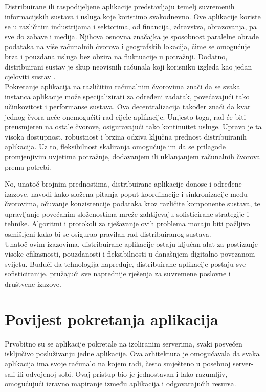 \documentclass[times, utf8, diplomski]{fer}
\begin{document}
Distribuirane ili raspodijeljene aplikacije predstavljaju temelj suvremenih informacijskih sustava i usluga koje koristimo svakodnevno. Ove aplikacije koriste se u različitim industrijama i sektorima, od financija, zdravstva, obrazovanja, pa sve do zabave i medija. Njihova osnovna značajka je sposobnost paralelne obrade podataka na više računalnih čvorova i geografskih lokacija, čime se omogućuje brza i pouzdana usluga bez obzira na fluktuacije u potražnji. Dodatno, distribuirani sustav je skup neovisnih računala koji korisniku izgleda kao jedan cjeloviti sustav \citep{tanenbaum_distributed_2007}.\\

Pokretanje aplikacija na različitim računalnim čvorovima znači da se svaka instanca aplikacije može specijalizirati za određeni zadatak, povećavajući tako učinkovitost i performanse sustava. Ova decentralizacija također znači da kvar jednog čvora neće onemogućiti rad cijele aplikacije. Umjesto toga, rad će biti preusmjeren na ostale čvorove, osiguravajući tako kontinuitet usluge. Upravo je ta visoka dostupnost, robustnost i brzina odziva ključna prednost distribuiranih aplikacija. Uz to, fleksibilnost skaliranja omogućuje im da se prilagode promjenjivim uvjetima potražnje, dodavanjem ili uklanjanjem računalnih čvorova prema potrebi.

No, unatoč brojnim prednostima, distribuirane aplikacije donose i određene izazove. \citet{zarko_raspodijeljeni_2013} navodi kako složena pitanja poput koordinacije i sinkronizacije među čvorovima, očuvanje konzistencije podataka kroz različite komponente sustava, te upravljanje povećanim složenostima mreže zahtijevaju sofisticirane strategije i tehnike. Algoritmi i protokoli za rješavanje ovih problema moraju biti pažljivo osmišljeni kako bi se osigurao pravilan rad distribuiranog sustava. \\

Unatoč ovim izazovima, distribuirane aplikacije ostaju ključan alat za postizanje visoke efikasnosti, pouzdanosti i fleksibilnosti u današnjem digitalno povezanom svijetu. Budući da tehnologija napreduje, distribuirane aplikacije postaju sve sofisticiranije, pružajući sve naprednije rješenja za suvremene poslovne i društvene izazove.

\section{Povijest pokretanja aplikacija}

Prvobitno su se aplikacije pokretale na izoliranim serverima, svaki posvećen isključivo posluživanju jedne aplikacije. Ova arhitektura je omogućavala da svaka aplikacija ima svoje računalo na kojem radi, često smješteno u posebnoj server-sali ili odvojenoj sobi. Ovaj pristup bio je jednostavan i lako razumljiv, omogućujući izravno mapiranje između aplikacija i odgovarajućih resursa. 
\end{document}
